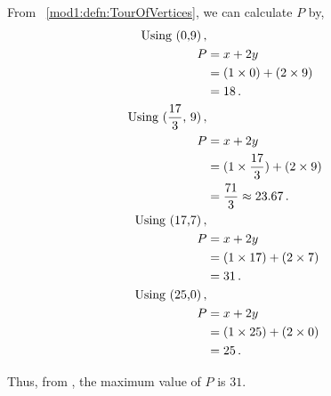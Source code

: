 \begin{subquestions}
\begin{subsubquestions}
\subsubquestion

From ~\ref{mod1:defn:TourOfVertices}, we can calculate $P$ by,
\begin{align}
	\text{Using (0,9)} \,, \nonumber \\
	P & = x + 2y  \nonumber \\
      & = (1 \times 0) + (2 \times 9)  \nonumber \\
	  & = 18 \,. \\
	\text{Using ($\frac{17}{3}$, 9)} \,, \nonumber \\
	P & = x + 2y  \nonumber \\
	  & = (1 \times \frac{17}{3}) + (2 \times 9)  \nonumber \\
	  & = \frac{71}{3} \approx 23.67 \,.    \\		  
	\text{Using (17,7)} \,, \nonumber \\
	P & = x + 2y  \nonumber \\
	  & = (1 \times 17) + (2 \times 7)  \nonumber \\
	  & = 31 \,. \label{2010:q1:eqn:Profit} \\
	\text{Using (25,0)} \,, \nonumber \\
	P & = x + 2y  \nonumber \\
	  & = (1 \times 25) + (2 \times 0)  \nonumber \\
	  & = 25 \,. 
\end{align}

Thus, from , the maximum value of $P$ is $31$.

\end{subsubquestions}


\subquestion

\begin{subsubquestions}
	

\subsubquestion


\end{subsubquestions}
\end{subquestions}
